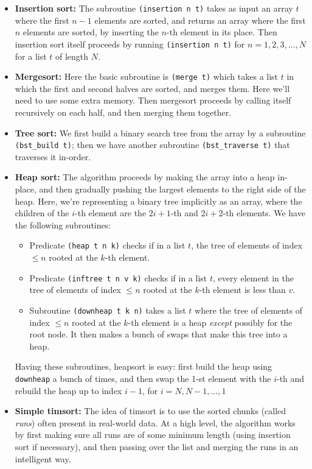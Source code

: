 \documentclass{article}
\begin{document}
\begin{itemize}
  \item
\textbf{Insertion sort:} The subroutine \verb|(insertion n t)| takes as input
an array $t$ where the first $n-1$ elements are sorted, and returns an array
where the first $n$ elements are sorted, by inserting the $n$-th element in its
place. Then insertion sort itself proceeds by running \verb|(insertion n t)|
for $n=1,2,3,\ldots,N$ for a list $t$ of length $N$.
  \item
\textbf{Mergesort:} Here the basic subroutine is \verb|(merge t)| which takes a
list $t$ in which the first and second halves are sorted, and merges them. Here
we'll need to use some extra memory. Then mergesort proceeds by calling itself
recursively on each half, and then merging them together.
  \item
\textbf{Tree sort:} We first build a binary search tree from the array by a
subroutine \verb|(bst_build t)|; then we have another subroutine
\verb|(bst_traverse t)| that traverses it in-order.
  \item
\textbf{Heap sort:} The algorithm proceeds by making the array into a heap
in-place, and then gradually pushing the largest elements to the right side of
the heap. Here, we're representing a binary tree implicitly as an array, where
the children of the $i$-th element are the $2i+1$-th and $2i+2$-th elements. We
have the following subroutines:
  \begin{itemize}
  \item
Predicate \verb|(heap t n k)| checks if in a list $t$, the tree of elements of
index $\leq n$ rooted at the $k$-th element.
  \item
Predicate \verb|(inftree t n v k)| checks if in a list $t$, every element in
the tree of elements of index $\leq n$ rooted at the $k$-th element is less
than $v$.
  \item
Subroutine \verb|(downheap t k n)| takes a list $t$ where the tree of elements
of index $\leq n$ rooted at the $k$-th element is a heap \emph{except} possibly
for the root node. It then makes a bunch of swaps that make this tree into a
heap.
\end{itemize}
Having these subroutines, heapsort is easy: first build the heap using
\verb|downheap| a bunch of times, and then swap the 1-st element with the
$i$-th and rebuild the heap up to index $i-1$, for $i = N, N-1, \ldots, 1$
  \item
\textbf{Simple timsort:} The idea of timsort is to use the sorted chunks
(called \emph{runs}) often present in real-world data. At a high level, the
algorithm works by first making sure all runs are of some minimum length (using
insertion sort if necessary), and then passing over the list and merging the
runs in an intelligent way.


\end{itemize}
\end{document}
